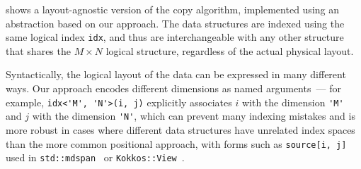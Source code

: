  shows a layout-agnostic version of the copy algorithm, implemented using an abstraction based on our approach. The data structures are indexed using the same logical index \lstinline{idx}, and thus are interchangeable with any other structure that shares the $M \times N$ logical structure, regardless of the actual physical layout.

Syntactically, the logical layout of the data can be expressed in many different ways. Our approach encodes different dimensions as named arguments~--- for example, \lstinline{idx<'M', 'N'>(i, j)} explicitly associates $i$ with the dimension \lstinline{'M'} and $j$ with the dimension \lstinline{'N'}, which can prevent many indexing mistakes and is more robust in cases where different data structures have unrelated index spaces than the more common positional approach, with forms such as \lstinline{source[i, j]} used in \lstinline{std::mdspan}~\cite{trott2022mdspan} or \lstinline{Kokkos::View}~\cite{trott2021kokkos}.


